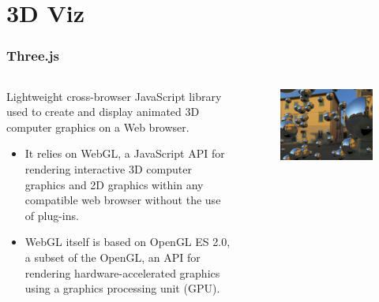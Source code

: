 \documentclass[hyperref={pdfpagelabels=true}]{beamer}
\begin{document}
\section{3D Viz} 
\begin{frame}
\frametitle{Three.js}
\begin{columns}
  \begin{column}{0.5\textwidth}\tiny{ 
  Lightweight cross-browser JavaScript library used to create and display animated 3D computer graphics on a Web browser.  
  \begin{itemize}
    \item<2->It relies on WebGL, a JavaScript API for rendering interactive 3D computer graphics and 2D graphics within any compatible web browser without the use of plug-ins.
    \item<3->WebGL itself is based on OpenGL ES 2.0, a subset of the OpenGL, an API for rendering hardware-accelerated graphics using a graphics processing unit (GPU).%
\end{itemize}}
  \end{column}
  \begin{column}{0.5\textwidth}
      \begin{figure}  
	\includegraphics[width=\textwidth]{threejs2.png}    
      \end{figure}  
  \end{column}  
\end{columns}
\end{frame}
\end{document}
